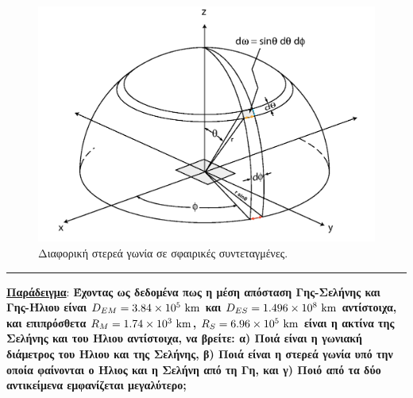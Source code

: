 \begin{figure}[h]
    \centering
    \includegraphics[scale=0.3]{Figures/diferential_solid_angle.png}
    \caption{Διαφορική στερεά γωνία σε σφαιρικές συντεταγμένες.}
    \label{fig:diff_solid_angle}
\end{figure}
\hrule
\underline{\textbf{Παράδειγμα}}:
\textbf{Έχοντας ως δεδομένα πως η μέση απόσταση Γης-Σελήνης και Γης-Ήλιου είναι $D_{EM} = 3.84 \times 10^5 \ \rm km$ και $D_{ES} = 1.496 \times 10^8 \ \rm km$ αντίστοιχα, και επιπρόσθετα $R_M = 1.74 \times 10^3 \ \rm km$, $R_S = 6.96 \times 10^5 \ \rm km$ είναι η ακτίνα της Σελήνης και του Ήλιου αντίστοιχα, να βρείτε: α) Ποιά είναι η γωνιακή διάμετρος του Ήλιου και της Σελήνης, β) Ποιά είναι η στερεά γωνία υπό την οποία φαίνονται ο Ήλιος και η Σελήνη από τη Γη, και γ) Ποιό από τα δύο αντικείμενα εμφανίζεται μεγαλύτερο;}

